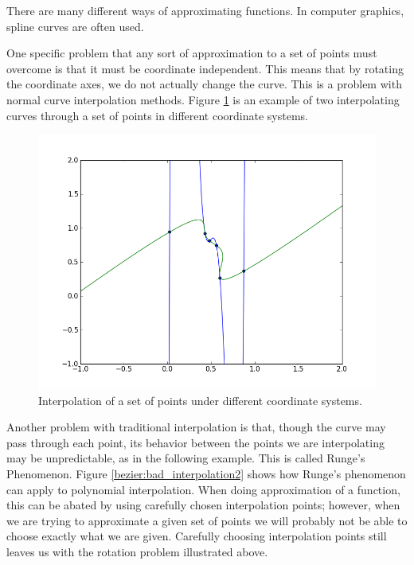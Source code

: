 

There are many different ways of approximating functions. 
In computer graphics, spline curves are often used. 

One specific problem that any sort of approximation to a set of points must overcome is that it must be coordinate independent. 
This means that by rotating the coordinate axes, we do not actually change the curve. 
This is a problem with normal curve interpolation methods. 
Figure \ref{bezier:bad_interpolation} is an example of two interpolating curves through a set of points in different coordinate systems.

\begin{figure}
\includegraphics[width=.9\textwidth]{bad_interpolation}
\caption{Interpolation of a set of points under different coordinate systems.}
\label{bezier:bad_interpolation}
\end{figure}

Another problem with traditional interpolation is that, though the curve may pass through each point, its behavior between the points we are interpolating may be unpredictable, as in the following example. 
This is called Runge's Phenomenon.
Figure \ref{bezier:bad_interpolation2} shows how Runge's phenomenon can apply to polynomial interpolation.
When doing approximation of a function, this can be abated by using carefully chosen interpolation points; however, when we are trying to approximate a given set of points we will probably not be able to choose exactly what we are given. 
Carefully choosing interpolation points still leaves us with the rotation problem illustrated above.

